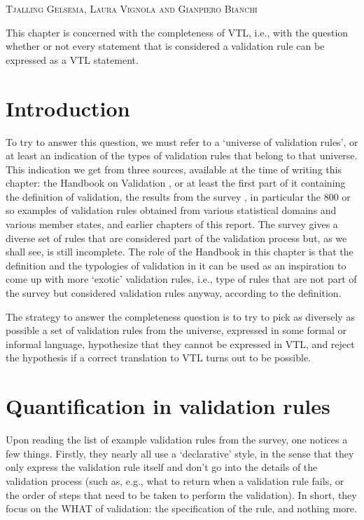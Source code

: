 \textsc{\Large Tjalling Gelsema, Laura Vignola and Gianpiero Bianchi}
\vspace{0.6 cm}

\noindent
This chapter is concerned with the completeness of VTL, i.e., with the question whether or not every statement that is considered a validation rule can be expressed as a VTL statement.

\section*{Introduction}
To try to answer this question, we must refer to a `universe of validation rules', or at least an indication of the types of validation rules that belong to that universe. This indication we get from three sources, available at the time of writing this chapter: the Handbook on Validation \cite{validation_handbook}, or at least the first part of it containing the definition of validation, the results from the survey \cite{validation_survey}, in particular the 800 or so examples of validation rules obtained from various statistical domains and various member states, and earlier chapters of this report. The survey gives a diverse set of rules that are considered part of the validation process but, as we shall see, is still incomplete. The role of the Handbook in this chapter is that the definition and the typologies of validation in it can be used as an inspiration to come up with more `exotic' validation rules, i.e., type of rules that are not part of the survey but considered validation rules anyway, according to the definition.

The strategy to answer the completeness question is to try to pick as diversely as possible a set of validation rules from the universe, expressed in some formal or informal language, hypothesize that they cannot be expressed in VTL, and reject the hypothesis if a correct translation to VTL turns out to be possible.

\section{Quantification in validation rules}
Upon reading the list of example validation rules from the survey, one notices a few things. Firstly, they nearly all use a `declarative' style, in the sense that they only express the validation rule itself and don't go into the details of the validation process (such as, e.g., what to return when a validation rule fails, or the order of steps that need to be taken to perform the validation). In short, they focus on the WHAT of validation: the specification of the rule, and nothing more.

